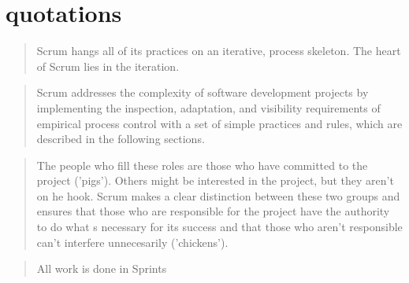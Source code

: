 \section*{quotations}


\begin{quotation}
  Scrum hangs all of its practices on an iterative,  process skeleton. The heart of Scrum lies in the iteration.
\end{quotation}


\begin{quotation}
  Scrum addresses the complexity of software development projects by implementing the inspection, adaptation, and visibility requirements of empirical process control with a set of simple practices and rules, which are described in the following sections. 
\end{quotation}


\begin{quotation}
  The people who fill these roles are those who have committed to the project ('pigs'). Others might be interested in the project, but they aren’t on  he hook. Scrum makes a clear distinction between these two groups and ensures that those who are responsible for the project have the authority to do what  s necessary for its success and that those who aren’t responsible can’t interfere unnecesarily ('chickens'). 
\end{quotation}


\begin{quotation}
  All work is done in Sprints
\end{quotation}


\begin{quotation}
  
\end{quotation}


\begin{quotation}
  
\end{quotation}


\begin{quotation}
  
\end{quotation}


\begin{quotation}
  
\end{quotation}


\begin{quotation}
  
\end{quotation}


